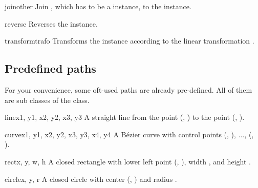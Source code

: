 \begin{methoddesc}{join}{other}
  Join , which has to be a  instance, to
  the  instance.
\end{methoddesc}

\begin{methoddesc}{reverse}{}
  Reverses the  instance.
\end{methoddesc}

\begin{methoddesc}{transform}{trafo}
  Transforms the  instance according to the linear
  transformation .
\end{methoddesc}

\subsection{Predefined paths}

\label{path:predefined}

For your convenience, some oft-used paths are already pre-defined. All
of them are sub classes of the  class.

\begin{classdesc}{line}{x1, y1, x2, y2, x3, y3}
A straight line from the point (, ) to the point (, ).
\end{classdesc}

\begin{classdesc}{curve}{x1, y1, x2, y2, x3, y3, x4, y4}
A B\'ezier curve with 
control points  (, ), $\dots$, (, ).\
\end{classdesc}

\begin{classdesc}{rect}{x, y, w, h}
A closed rectangle with lower left point (, ), width , and
  height \var{h}.
\end{classdesc}

\begin{classdesc}{circle}{x, y, r}
A closed circle with center (, ) and radius .
\end{classdesc}

